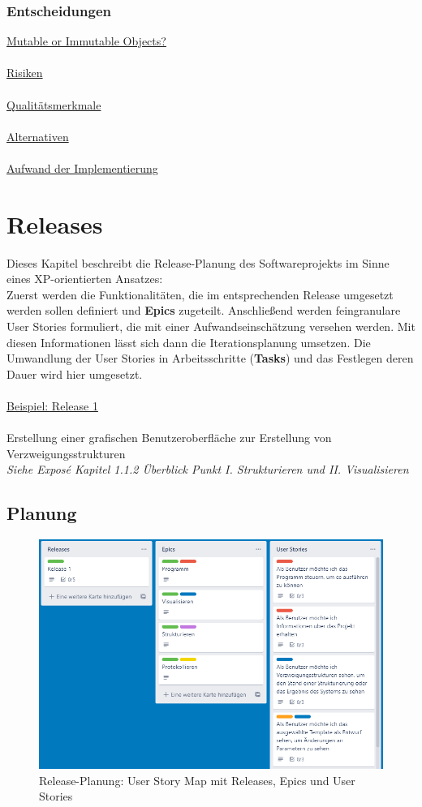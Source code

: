 \documentclass[11pt]{article}
\begin{document}
    \subsubsection{Entscheidungen}
        \underline{Mutable or Immutable Objects?}\\~\\
        \underline{Risiken}\\~\\
        \underline{Qualitätsmerkmale}\\~\\
        \underline{Alternativen}\\~\\
        \underline{Aufwand der Implementierung}

    \newpage

    \section{Releases}
    Dieses Kapitel beschreibt die Release-Planung des Softwareprojekts im Sinne eines XP-orientierten Ansatzes:\\
    Zuerst werden die Funktionalitäten, die im entsprechenden Release umgesetzt werden sollen definiert und \textbf{Epics}
    zugeteilt.
    Anschließend werden feingranulare User Stories formuliert, die mit einer Aufwandseinschätzung versehen werden.
    Mit diesen Informationen lässt sich dann die Iterationsplanung umsetzen.
    Die Umwandlung der User Stories in Arbeitsschritte (\textbf{Tasks}) und das Festlegen deren Dauer wird hier
    umgesetzt.\\~\\
    \underline{Beispiel: Release 1}\\~\\
    Erstellung einer grafischen Benutzeroberfläche zur Erstellung von Verzweigungsstrukturen\\
    \textit{Siehe Exposé Kapitel 1.1.2 Überblick Punkt I. Strukturieren und II. Visualisieren}
    
    \subsection{Planung}
    \begin{figure}[H]
        \centering
        \includegraphics[width=12cm]{../images/User_Story_Map.PNG}
        \caption{Release-Planung: User Story Map mit Releases, Epics und User Stories}
    \end{figure}
\end{document}
